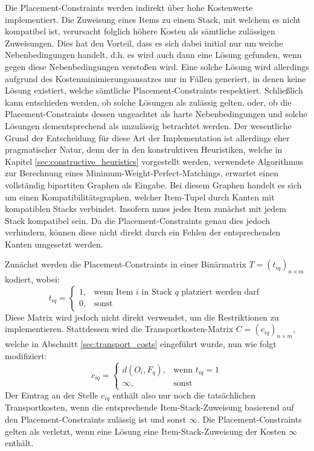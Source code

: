 Die Placement-Constraints werden indirekt über hohe Kostenwerte implementiert. Die Zuweisung eines Items zu einem
Stack, mit welchem es nicht kompatibel ist, verursacht folglich höhere Kosten als sämtliche zulässigen Zuweisungen.
Dies hat den Vorteil, dass es sich dabei initial nur um weiche Nebenbedingungen handelt,
d.h. es wird auch dann eine Lösung gefunden, wenn gegen diese Nebenbedingungen verstoßen wird.
Eine solche Lösung wird allerdings aufgrund des Kostenminimierungsansatzes nur in Fällen generiert,
in denen keine Lösung existiert, welche sämtliche Placement-Constraints respektiert.
Schließlich kann entschieden werden, ob solche Lösungen als zulässig gelten,
oder, ob die Placement-Constraints dessen ungeachtet als harte Nebenbedingungen und solche
Lösungen dementsprechend als unzulässig betrachtet werden.
Der wesentliche Grund der Entscheidung für diese Art der Implementation ist allerdings eher pragmatischer Natur, denn der in den konstruktiven Heuristiken, welche in Kapitel \ref{sec:constructive_heuristics} vorgestellt werden, verwendete Algorithmus zur Berechnung eines Minimum-Weight-Perfect-Matchings, erwartet einen vollständig bipartiten Graphen als Eingabe. Bei diesem Graphen handelt es sich um einen Kompatibilitätsgraphen, welcher Item-Tupel durch Kanten mit kompatiblen Stacks verbindet. Insofern muss jedes Item zunächst mit jedem Stack kompatibel sein. Da die Placement-Constraints genau dies jedoch verhindern, können diese nicht direkt durch ein Fehlen der entsprechenden Kanten umgesetzt werden.

\vfill
\pagebreak

Zunächst werden die Placement-Constraints in einer Binärmatrix $T = (t_{iq})_{n \times m}$ kodiert, wobei:
\[
    t_{iq} =
\begin{cases}
    1, & \text{wenn Item $i$ in Stack $q$ platziert werden darf }\\
    0, & \text{sonst}
\end{cases}
\]
Diese Matrix wird jedoch nicht direkt verwendet, um die Restriktionen zu implementieren. Stattdessen wird
die Transportkosten-Matrix $C = (c_{iq})_{n \times m}$, welche in Abschnitt \ref{sec:transport_costs} eingeführt wurde, nun wie folgt modifiziert:
\[
    c_{iq} =
\begin{cases}
    d(O_i, F_q), & \text{wenn $t_{iq} = 1$}\\
    \infty, & \text{sonst}
\end{cases}
\]
Der Eintrag an der Stelle $c_{iq}$ enthält also nur noch die tatsächlichen Transportkosten, wenn die
entsprechende Item-Stack-Zuweisung basierend auf den Placement-Constraints zulässig ist und sonst $\infty$.
Die Placement-Constraints gelten als verletzt, wenn eine Lösung eine Item-Stack-Zuweisung
der Kosten $\infty$ enthält.

